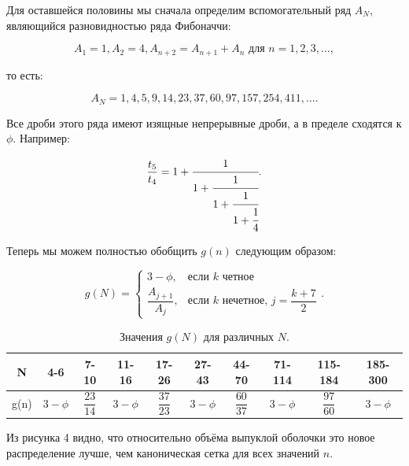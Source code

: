\documentclass[12pt, a4paper]{article}
\begin{document}
Для оставшейся половины мы сначала определим вспомогательный ряд $A_N$, являющийся разновидностью ряда Фибоначчи:

\begin{displaymath}
	A_1 =1, A_2 = 4, A_{n+2}= A_{n+1}+A_n \textrm{ для } n = 1,2,3, \ldots,
\end{displaymath}

\noindent то есть:

\begin{displaymath}
	A_N = 1,4,5,9,14,23,37,60,97,157,254,411, \ldots.
\end{displaymath}

\newpage

Все дроби этого ряда имеют изящные непрерывные дроби, а в пределе сходятся к $\phi$. Например:

\begin{displaymath}
	\frac{t_5}{t_4} = 1 + \cfrac{1}{1 + \cfrac{1}{1 + \cfrac{1}{ 1 + \cfrac{1}{4}}}}.
\end{displaymath}

Теперь мы можем полностью обобщить $g(n)$ следующим образом:

\begin{displaymath}
	g(N) =
		\begin{cases}
			3-\phi, & \text{если $k$ четное} \\
			\dfrac{A_{j+1}}{A_j} , & \text{если $k$ нечетное, $j=\dfrac{k+7}{2}$}
 		\end{cases}.
	\tag{6}
\end{displaymath}

\begin{table}[H]
\caption{Значения $g(N)$ для различных $N$.}
\begin{center}
\begin{tabular}{ |c|c|c|c|c|c|c|c|c|c| } 
\hline
\rule[-1.5ex]{0pt}{4.5ex} N & 4-6 & 7-10 & 11-16 & 17-26 & 27-43 & 44-70 & 71-114 & 115-184 & 185-300 \\
\hline
\rule[-3ex]{0pt}{7.5ex} g(n) & $3-\phi$ & $\dfrac{23}{14}$ & $3-\phi$ & $\dfrac{37}{23}$ & $3-\phi$ & $\dfrac{60}{37}$ & $3-\phi$ & $\dfrac{97}{60}$ & $3-\phi$ \\
\hline
\end{tabular}
\end{center}
\end{table}

Из рисунка 4 видно, что относительно объёма выпуклой оболочки это новое распределение лучше, чем каноническая сетка для всех значений $n$.
\end{document}
